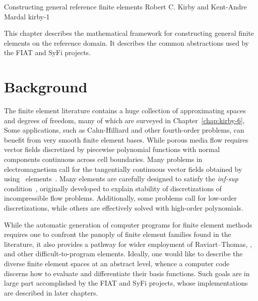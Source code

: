 \newcommand{\mathbfx}[1]{{\mbox{\boldmath $#1$}}}
\renewcommand{\P}{{\mathbb P}}
\renewcommand{\H}{{\mathbb H}}
\newcommand{\GG}{\mathbf{G}}
\newcommand{\kentc}[1]{\marginpar{\tiny KAM: #1}}
\newcommand{\rckc}[1]{\marginpar{\tiny RCK: #1}}

              {Constructing general reference finite elements}
              {Robert C. Kirby and Kent-Andre Mardal}
              {kirby-1}

%




This chapter describes the mathematical framework for constructing general finite elements on 
the reference domain. It describes the common abstractions used by the FIAT and SyFi projects.  

\section{Background}
The finite element literature contains a huge collection of
approximating spaces and degrees of freedom, many of which are
surveyed in Chapter~\ref{chap:kirby-6},
Some applications, such as Cahn-Hilliard and
other fourth-order problems, can benefit from very smooth finite
element bases.  While porous media flow requires
vector fields discretized by piecewise polynomial functions with
normal components continuous across cell boundaries.  Many problems in
electromagnetism call for the tangentially continuous vector fields obtained
by using \nedelec\ elements~\citep{Nedelec1980,Nedelec1986}.  Many elements are carefully designed
to satisfy the \emph{inf-sup} condition~\citep{BrezziFortin1991,GiraultRaviart1986},
originally developed to explain stability of discretizations of
incompressible flow problems.  Additionally, some problems call for low-order
discretizations, while others are effectively solved with high-order
polynomials.

While the automatic generation of computer programs for finite element
methods requires one to confront the panoply of  finite
element families found in the literature, it also provides a pathway
for wider employment of Raviart--Thomas, \nedelec, and other
difficult-to-program elements.
Ideally, one would like to
describe the diverse finite element spaces at an abstract level,
whence a computer code discerns how to evaluate and differentiate
their basis functions.  Such goals are in large part accomplished by
the FIAT and SyFi projects, whose implementations are described in
later chapters.

